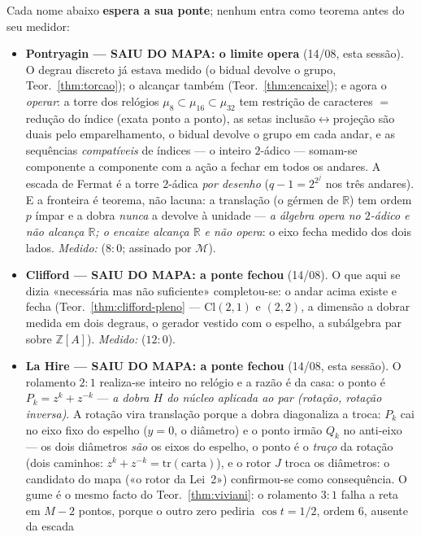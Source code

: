 \documentclass[livro.tex]{subfiles}
\begin{document}
Cada nome abaixo \textbf{espera a sua ponte}; nenhum entra como teorema
antes do seu medidor:
\begin{itemize}
\item \textbf{Pontryagin --- SAIU DO MAPA: o limite opera} (14/08,
esta sessão). O degrau discreto já estava medido (o bidual devolve o
grupo, Teor.~\ref{thm:torcao}); o alcançar também
(Teor.~\ref{thm:encaixe}); e agora o \emph{operar}: a torre dos
relógios $\mu_{8}\subset\mu_{16}\subset\mu_{32}$ tem restrição de
caracteres $=$ redução do índice (exata ponto a ponto), as setas
inclusão$\leftrightarrow$projeção são duais pelo emparelhamento, o
bidual devolve o grupo em cada andar, e as sequências
\emph{compatíveis} de índices --- o inteiro $2$-ádico --- somam-se
componente a componente com a ação a fechar em todos os andares. A
escada de Fermat é a torre $2$-ádica \emph{por desenho}
($q-1=2^{2^{j}}$ nos três andares). E a fronteira é teorema, não
lacuna: a translação (o gérmen de $\mathbb{R}$) tem ordem $p$ ímpar e
a dobra \emph{nunca} a devolve à unidade --- \emph{a álgebra opera no
$2$-ádico e não alcança $\mathbb{R}$; o encaixe alcança $\mathbb{R}$ e
não opera}: o eixo fecha medido dos dois lados.
\emph{Medido:}  ($8{:}0$; assinado por
$\mathcal{M}$).
\item \textbf{Clifford --- SAIU DO MAPA: a ponte fechou} (14/08). O
que aqui se dizia «necessária mas não suficiente» completou-se: o
andar acima existe e fecha (Teor.~\ref{thm:clifford-pleno} ---
$\mathrm{Cl}(2,1)$ e $(2,2)$, a dimensão a dobrar medida em dois
degraus, o gerador vestido com o espelho, a subálgebra par sobre
$\mathbb{Z}[A]$). \emph{Medido:} 
($12{:}0$).
\item \textbf{La Hire --- SAIU DO MAPA: a ponte fechou} (14/08,
esta sessão). O rolamento $2{:}1$ realiza-se inteiro no relógio e a
razão é da casa: o ponto é $P_{k}=z^{k}+z^{-k}$ --- \emph{a dobra
$H$ do núcleo aplicada ao par (rotação, rotação inversa)}. A rotação
vira translação porque a dobra diagonaliza a troca: $P_{k}$ cai no
eixo fixo do espelho ($y=0$, o diâmetro) e o ponto irmão $Q_{k}$ no
anti-eixo --- os dois diâmetros \emph{são} os eixos do espelho, o
ponto é o \emph{traço} da rotação (dois caminhos:
$z^{k}+z^{-k}=\mathrm{tr}(\mathrm{carta})$), e o rotor $J$ troca os
diâmetros: o candidato do mapa («o rotor da Lei~2») confirmou-se como
consequência. O gume é o mesmo facto do Teor.~\ref{thm:viviani}: o
rolamento $3{:}1$ falha a reta em $M{-}2$ pontos, porque o outro zero
pediria $\cos t=1/2$, ordem $6$, ausente da escada

\end{itemize}
\end{document}
